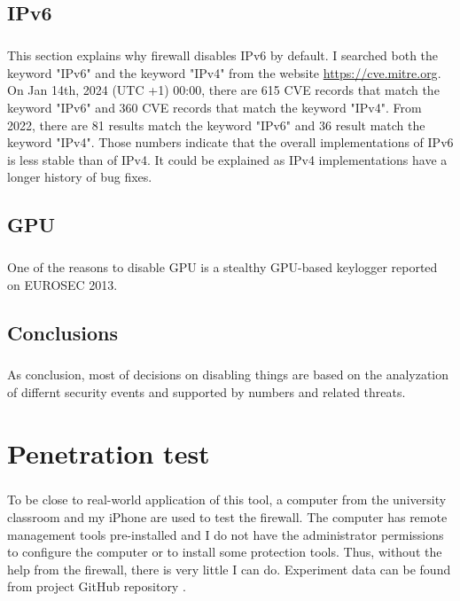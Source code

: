 \documentclass[mscthesis]{usiinfthesis}
\begin{document}
\section{IPv6}
\paragraph{}
This section explains why firewall disables IPv6 by default. I searched both the keyword "IPv6" and the keyword "IPv4" from the website \url{https://cve.mitre.org}. On Jan 14th, 2024 (UTC +1) 00:00, there are 615 CVE records that match the keyword "IPv6" and 360 CVE records that match the keyword "IPv4". From 2022, there are 81 results match the keyword "IPv6" and 36 result match the keyword "IPv4". Those numbers indicate that the overall implementations of IPv6 is less stable than of IPv4. It could be explained as IPv4 implementations have a longer history of bug fixes.

\section{GPU}
\paragraph{}
One of the reasons to disable GPU is a stealthy GPU-based keylogger reported on EUROSEC 2013. \citep{gpu:keylogger}

\section{Conclusions}
\paragraph{}
As conclusion, most of decisions on disabling things are based on the analyzation of differnt security events and supported by numbers and related threats.

\chapter{Penetration test}\label{cha:test}
\paragraph{}
To be close to real-world application of this tool, a computer from the university classroom and my iPhone are used to test the firewall. The computer has remote management tools pre-installed and I do not have the administrator permissions to configure the computer or to install some protection tools. Thus, without the help from the firewall, there is very little I can do. Experiment data can be found from project GitHub repository \citep{hood:github}.
\end{document}
